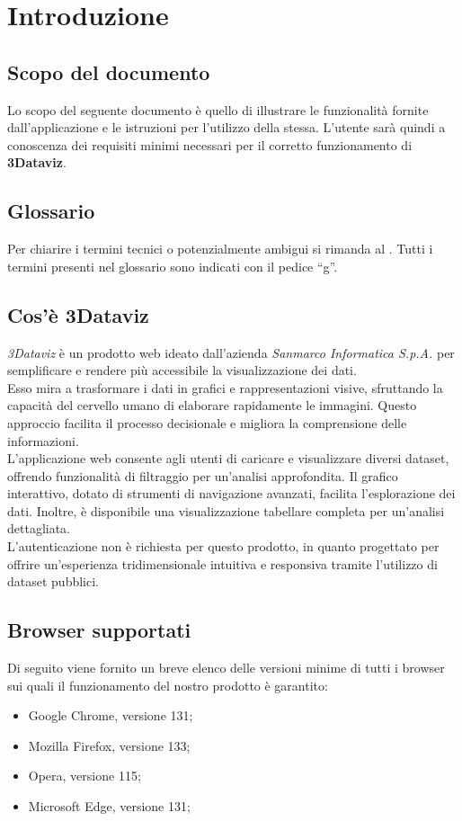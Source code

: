 \section{Introduzione}
\subsection{Scopo del documento}
Lo scopo del seguente documento è quello di illustrare le funzionalità fornite dall'applicazione e le istruzioni
per l'utilizzo della stessa. L'utente sarà quindi a conoscenza dei requisiti minimi necessari per il
corretto funzionamento di \textbf{3Dataviz}.

\subsection{Glossario}
Per chiarire i termini tecnici o potenzialmente ambigui si rimanda al .
Tutti i termini presenti nel glossario sono indicati con il pedice “g”. 

\subsection{Cos'è 3Dataviz}
\textit{3Dataviz} è un prodotto web ideato dall'azienda \textit{Sanmarco Informatica S.p.A.} per semplificare e rendere più accessibile la visualizzazione dei dati.\\
Esso mira a trasformare i dati in grafici e rappresentazioni visive, sfruttando la capacità del cervello umano di elaborare rapidamente le immagini. 
Questo approccio facilita il processo decisionale e migliora la comprensione delle informazioni.\\

L'applicazione web consente agli utenti di caricare e visualizzare diversi dataset, offrendo funzionalità di filtraggio per un'analisi approfondita.
Il grafico interattivo, dotato di strumenti di navigazione avanzati, facilita l'esplorazione dei dati. 
Inoltre, è disponibile una visualizzazione tabellare completa per un'analisi dettagliata.\\

L'autenticazione non è richiesta per questo prodotto, in quanto progettato per offrire un'esperienza tridimensionale
intuitiva e responsiva tramite l'utilizzo di dataset pubblici.

\subsection{Browser supportati}
Di seguito viene fornito un breve elenco delle versioni minime di tutti i browser sui quali il funzionamento
del nostro prodotto è garantito:
\begin{itemize}
    \item Google Chrome, versione 131;
    \item Mozilla Firefox, versione 133;
    \item Opera, versione 115;
    \item Microsoft Edge, versione 131;
\end{itemize}

